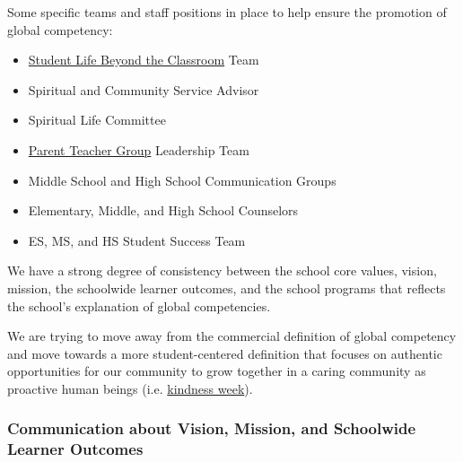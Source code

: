 \begin{findings}
Some specific teams and staff positions in place to help ensure the promotion of global competency:

\begin{itemize}
\item \href{http://blogs.cmis.ac.th/eagles/}{Student Life Beyond the Classroom} Team
\item Spiritual and Community Service Advisor
\item Spiritual Life Committee
\item \href{http://blogs.cmis.ac.th/ptg/about/}{Parent Teacher Group} Leadership Team
\item Middle School and High School Communication Groups
\item Elementary, Middle, and High School Counselors
\item ES, MS, and HS Student Success Team
\end{itemize}


We have a strong degree of consistency between the school core values, vision, mission, the schoolwide learner outcomes, and the school programs that reflects the school’s explanation of global competencies.

We are trying to move away from the commercial definition of global competency and move towards a more student-centered definition that focuses on authentic opportunities for our community to grow together in a caring community as proactive human beings (i.e. \href{https://drive.google.com/a/cmis.ac.th/file/d/0B0TYmzaZNi3fOF9RQkRqLV9saUE/view?usp=sharing}{kindness week}).
\end{findings}

\subsubsection{Communication about Vision, Mission, and Schoolwide Learner Outcomes}



